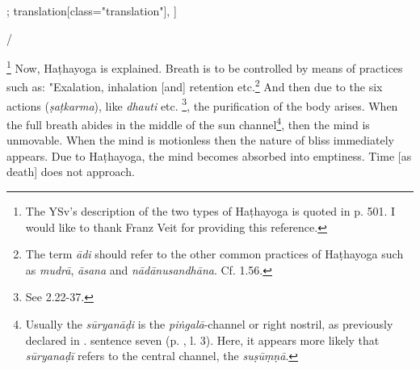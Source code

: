 \begin{alignment}[
  texts=edition[class="edition"];
  translation[class="translation"],
  ]
\begin{edition}
\begin{prose}[p20_01]
/
\dd{}
\end{prose}
  \end{edition}
  \begin{translation}
\label{hathayogatrans}
      \begin{tlate}[p19_01]
        \noindent
        \footnote{The YSv's description of the two types of Haṭhayoga is quoted in  p. 501. I would like to thank Franz Veit for providing this reference.} Now, Haṭhayoga is explained. Breath is to be controlled by means of practices such as: "Exalation, inhalation [and] retention etc.\footnote{The term \textit{ādi} should refer to the other common practices of Haṭhayoga such as \textit{mudrā}, \textit{āsana} and \textit{nādānusandhāna}. Cf.  1.56.} And then due to the six actions (\textit{ṣaṭkarma}), like \textit{dhauti} etc. \footnote{See  2.22-37.}, the purification of the body arises. When the full breath abides in the middle of the sun channel\footnote{Usually the \textit{sūryanāḍi} is the \textit{piṅgalā}-channel or right nostril, as previously declared in . sentence seven (p. \pageref{siddhayoga}, l. 3). Here, it appears more likely that \textit{sūryanaḍī} refers to the central channel, the \textit{suṣūṃṇā}.}, then the mind is unmovable. When the mind is motionless then the nature of bliss immediately appears. Due to Haṭhayoga, the mind becomes absorbed into emptiness. Time [as death] does not approach.

\end{tlate}
\end{translation}
\end{alignment}
